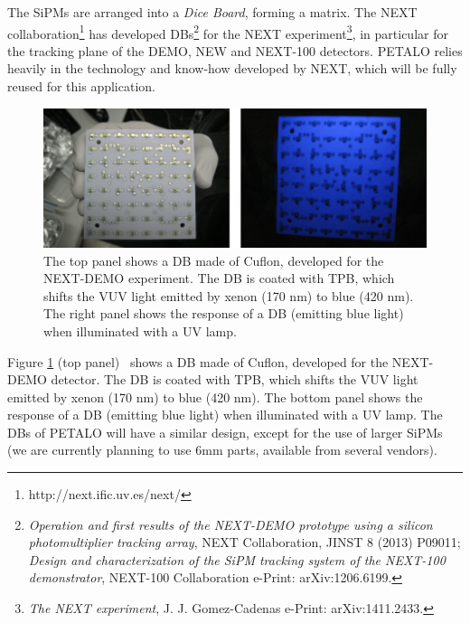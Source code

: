 
The SiPMs are arranged into a {\em Dice Board}, forming a matrix.
The NEXT collaboration\footnote{http://next.ific.uv.es/next/} has developed DBs\footnote{{\em
Operation and first results of the NEXT-DEMO prototype using a silicon photomultiplier tracking array}, 
NEXT Collaboration, JINST 8 (2013) P09011; {\em	
Design and characterization of the SiPM tracking system of the NEXT-100 demonstrator}, 
NEXT-100 Collaboration 
e-Print: arXiv:1206.6199. } for the NEXT experiment\footnote{
{\em The NEXT experiment},
J. J. Gomez-Cadenas e-Print: arXiv:1411.2433. }, in particular for the tracking plane of the DEMO, NEW and NEXT-100 detectors. PETALO relies heavily in the technology and know-how developed by NEXT, which will be fully reused for this application. 

\begin{figure}[!htb]
	\centering
	\includegraphics[scale=0.5]{img/DC.png}
	\caption{\label{fig.DB} The top panel shows a DB made of Cuflon, developed for the NEXT-DEMO experiment. The DB is coated with TPB, which shifts the VUV light emitted by xenon (170 nm) to blue (420 nm). The right panel shows the response of a DB (emitting blue light) when illuminated with a UV lamp.  }
\end{figure}


Figure \ref{fig.DB} (top panel) ~shows a DB made of Cuflon, developed for the NEXT-DEMO detector. The DB is coated with TPB, which shifts the VUV light emitted by xenon (170 nm) to blue (420 nm). The bottom panel shows the response of a DB (emitting blue light) when illuminated with a UV lamp. The DBs of PETALO will have a similar design, except for the use of larger SiPMs (we are currently planning to use 6mm parts, available from several vendors).

